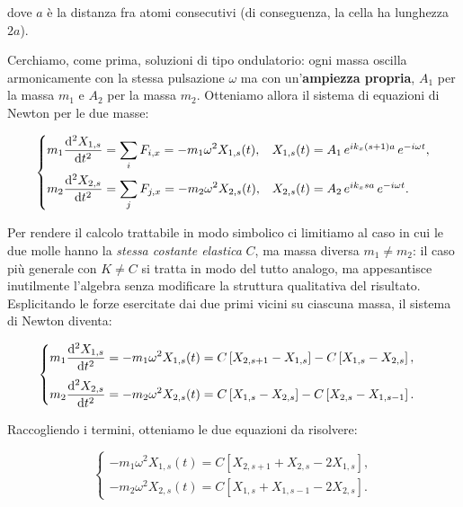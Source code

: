 dove \( a \) è la distanza fra atomi consecutivi (di conseguenza, la cella ha lunghezza \( 2a \)).

Cerchiamo, come prima, soluzioni di tipo ondulatorio: ogni massa oscilla armonicamente con la stessa pulsazione \( \omega \) ma con un'\textbf{ampiezza propria}, \( A_1 \) per la massa \( m_1 \) e \( A_2 \) per la massa \( m_2 \). Otteniamo allora il sistema di equazioni di Newton per le due masse:

\begin{equation}
    \begin{cases}
        \displaystyle m_1 \dv[2]{X_{1,s}}{t} = \sum_i F_{i,x} = -m_1 \omega^{2} X_{1,s}(t), & X_{1,s}(t) = A_1 \, e^{i k_x (s+1) a} \, e^{-i \omega t}, \\[1.2em]
        \displaystyle m_2 \dv[2]{X_{2,s}}{t} = \sum_j F_{j,x} = -m_2 \omega^{2} X_{2,s}(t), & X_{2,s}(t) = A_2 \, e^{i k_x s a} \, e^{-i \omega t}.
    \end{cases}
\end{equation}

Per rendere il calcolo trattabile in modo simbolico ci limitiamo al caso in cui le due molle hanno la \emph{stessa costante elastica} \( C \), ma massa diversa \(m_1 \neq m_2\): il caso più generale con \( K \neq C \) si tratta in modo del tutto analogo, ma appesantisce inutilmente l'algebra senza modificare la struttura qualitativa del risultato. Esplicitando le forze esercitate dai due primi vicini su ciascuna massa, il sistema di Newton diventa:

\begin{equation}
    \begin{cases}
        \displaystyle m_1 \dv[2]{X_{1,s}}{t} = -m_1 \omega^{2} X_{1,s}(t) = C \left[ X_{2,s+1} - X_{1,s} \right] - C \left[ X_{1,s} - X_{2,s} \right], \\[1em]
        \displaystyle m_2 \dv[2]{X_{2,s}}{t} = -m_2 \omega^{2} X_{2,s}(t) = C \left[ X_{1,s} - X_{2,s} \right] - C \left[ X_{2,s} - X_{1,s-1} \right].
    \end{cases}
\end{equation}

Raccogliendo i termini, otteniamo le due equazioni da risolvere:

\begin{equation}
    \begin{cases}
        -m_1 \omega^{2} X_{1,s}(t) = C \left[ X_{2,s+1} + X_{2,s} - 2 X_{1,s} \right], \\[0.6em]
        -m_2 \omega^{2} X_{2,s}(t) = C \left[ X_{1,s} + X_{1,s-1} - 2 X_{2,s} \right].
    \end{cases}
\end{equation}

